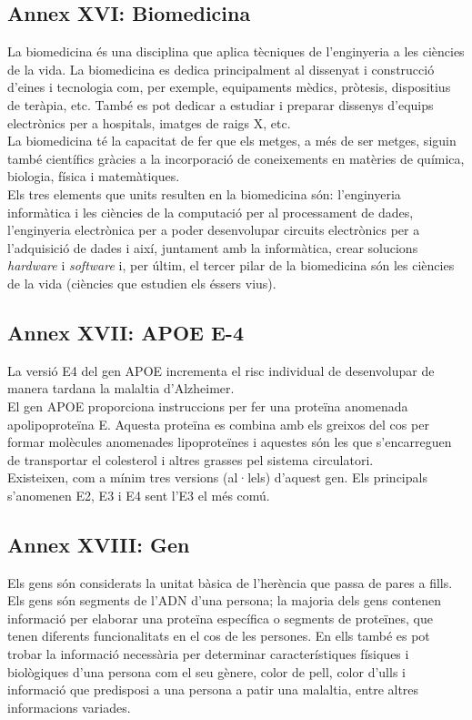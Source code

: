 \documentclass[a4paper,12pt]{article}
\begin{document}
\subsection*{Annex XVI: Biomedicina}
La biomedicina és una disciplina que aplica tècniques de l'enginyeria a les ciències de la vida. La biomedicina es dedica principalment al dissenyat i construcció d'eines i tecnologia com, per exemple, equipaments mèdics, pròtesis, dispositius de teràpia, etc. També es pot dedicar a estudiar i preparar dissenys d'equips electrònics per a hospitals, imatges de raigs X, etc.\\
La biomedicina té la capacitat de fer que els metges, a més de ser metges, siguin també científics gràcies a la incorporació de coneixements en matèries de química, biologia, física i matemàtiques.\\
Els tres elements que units resulten en la biomedicina són: l'enginyeria informàtica i les ciències de la computació per al processament de dades, l'enginyeria electrònica per a poder desenvolupar circuits electrònics per a l'adquisició de dades i així, juntament amb la informàtica, crear solucions \textit{hardware} i \textit{software} i, per últim, el tercer pilar de la biomedicina són les ciències de la vida (ciències que estudien els éssers vius).
\subsection*{Annex XVII: APOE E-4}
La versió E4 del gen APOE incrementa el risc individual de desenvolupar de manera tardana la malaltia d'Alzheimer.\\
El gen APOE proporciona instruccions per fer una proteïna anomenada apolipoproteïna E. Aquesta proteïna es combina amb els greixos del cos per formar molècules anomenades lipoproteïnes i aquestes són les que s'encarreguen de transportar el colesterol i altres grasses pel sistema circulatori.\\
Existeixen, com a mínim tres versions (al·lels) d'aquest gen. Els principals s'anomenen E2, E3 i E4 sent l'E3 el més comú.
\subsection*{Annex XVIII: Gen}
Els gens són considerats la unitat bàsica de l'herència que passa de pares a fills. Els gens són segments de l'ADN d'una persona; la majoria dels gens contenen informació per elaborar una proteïna específica o segments de proteïnes, que tenen diferents funcionalitats en el cos de les persones. En ells també es pot trobar la informació necessària per determinar característiques físiques i biològiques d'una persona com el seu gènere, color de pell, color d'ulls i informació que predisposi a una persona a patir una malaltia, entre altres informacions variades.
\end{document}
